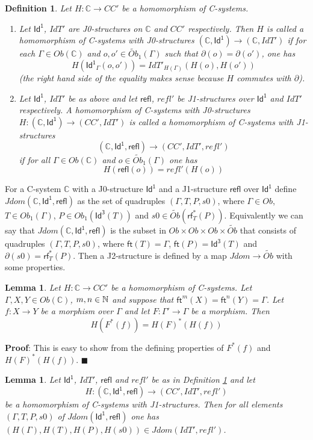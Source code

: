 \documentclass[12pt]{article}
\numberwithin{equation}{section}
\newenvironment{myproof}{{\bf Proof}:}{$\blacksquare$ \vskip 5mm }
\newtheorem{lemma}[proposition]{Lemma}
\newtheorem{definition}[proposition]{Definition}
\newcommand{\llabel}[1]{\label{#1}}
\newcommand{\sr}{\rightarrow}
\newcommand{\nn}{{\mathbb N\rm}}
\newcommand{\wt}{\widetilde}
\newcommand{\aCC}{{\mathbb C}}  %
\newcommand{\ft}{\mathsf{ft}}
\newcommand{\Id}{\mathsf{Id^1}} %
\newcommand{\Idx}{\mathsf{Id^3}} %
\newcommand{\refl}{\mathsf{refl}}
\newcommand{\rf}{\mathsf{rf}}
\begin{document}
%
\begin{definition}
\llabel{2015.04.06.def1} Let $H:\aCC\sr CC'$ be a homomorphism of C-systems.
%
\begin{enumerate}
\item Let $\Id$, $IdT'$ are J0-structures on $\aCC$ and $CC'$ respectively.  Then
  $H$ is called a homomorphism of C-systems with J0-structures $(\aCC,\Id)\sr
  (\aCC,IdT')$ if for each $\Gamma\in Ob(\aCC)$ and $o,o'\in\wt{Ob}_1(\Gamma)$ such
  that $\partial(o)=\partial(o')$, one has
%
$$H(\Id_{\Gamma}(o,o'))=IdT'_{H(\Gamma)}(H(o),H(o'))$$
%
(the right hand side of the equality makes sense because $H$ commutes with
  $\partial$).
% 
\item Let $\Id$, $IdT'$ be as above and let $\refl$, $refl'$ be J1-structures
  over $\Id$ and $IdT'$ respectively. A homomorphism of C-systems with
  J0-structures $H:(\aCC,\Id)\sr (CC',IdT')$ is called a homomorphism of
  C-systems with J1-structures
%
$$(\aCC,\Id,\refl)\sr (CC',IdT',refl')$$
%
if for all $\Gamma\in Ob(\aCC)$ and $o\in \wt{Ob}_1(\Gamma)$ one has
%
$$H(\refl(o))=refl'(H(o))$$
%
\end{enumerate}
\end{definition}
%
For a C-system $\aCC$ with a J0-structure $\Id$ and a J1-structure $\refl$ over
$\Id$ define $Jdom(\aCC,\Id,\refl)$ as the set of quadruples $(\Gamma,T,P,s0)$,
where $\Gamma\in Ob$, $T\in Ob_1(\Gamma)$, $P\in Ob_1(\Idx(T))$ and $s0\in
\wt{Ob}(\rf_T^*(P))$. Equivalently we can say that $Jdom(\aCC,\Id,\refl)$ is the
subset in $Ob\times Ob\times Ob\times \wt{Ob}$ that consists of quadruples
$(\Gamma,T,P,s0)$, where $\ft(T)=\Gamma$, $\ft(P)=\Idx(T)$ and
$\partial(s0)=\rf_T^*(P)$. Then a J2-structure is defined by a map $Jdom\sr
\wt{Ob}$ with some properties.
%
\begin{lemma}
\llabel{2015.04.06.l3} Let $H:\aCC\sr CC'$ be a homomorphism of C-systems. Let
$\Gamma,X,Y\in Ob(\aCC)$, $m,n\in\nn$ and suppose that
$\ft^m(X)=\ft^{n}(Y)=\Gamma$. Let $f:X\sr Y$ be a morphism over $\Gamma$ and let
$F:\Gamma'\sr \Gamma$ be a morphism. Then
%
$$H(F^*(f))=H(F)^*(H(f))$$
%
\end{lemma}
%
\begin{myproof}
This is easy to show from the defining properties of $F^*(f)$ and
$H(F)^*(H(f))$.
\end{myproof}
%
%
\begin{lemma}
\llabel{2015.04.06.l2} Let $\Id$, $IdT'$, $\refl$ and $refl'$ be as in
Definition \ref{2015.04.06.def1} and let
%
$$H:(\aCC,\Id,\refl)\sr (CC',IdT',refl')$$
%
be a homomorphism of C-systems with J1-structures. Then for all elements
$(\Gamma,T,P,s0)$ of $Jdom(\Id,\refl)$ one has $(H(\Gamma),H(T),H(P),H(s0))\in
Jdom(IdT',refl')$.
\end{lemma}
\end{document}

